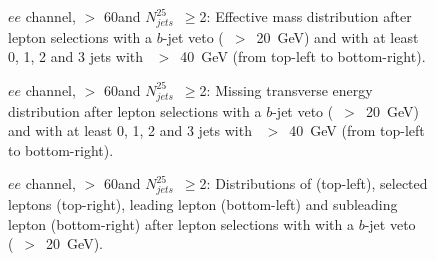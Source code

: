 \begin{figure}[h!]
\centering
{}
\caption{$ee$ channel, \met $>$ 60\GeV and $N_{jets}^{25}$~$\ge$2: Effective mass distribution after lepton selections with a $b$-jet veto (\pt~$>$~20~GeV) and with at least 0, 1, 2 and 3 jets with \pt~$>$~40~GeV (from top-left to bottom-right).}
\label{Fig:VP_ee_0b_Meff}
\end{figure}
\begin{figure}[h!]
\centering
{}
\caption{$ee$ channel, \met $>$ 60\GeV and $N_{jets}^{25}$~$\ge$2: Missing transverse energy distribution after lepton selections with a $b$-jet veto (\pt~$>$~20~GeV) and with at least 0, 1, 2 and 3 jets with \pt~$>$~40~GeV (from top-left to bottom-right).}
\label{Fig:VP_ee_0b_Met}
\end{figure}
\begin{figure}[h!]
\centering
{}
\caption{$ee$ channel, \met $>$ 60\GeV and $N_{jets}^{25}$~$\ge$2: Distributions of \mt (top-left), selected leptons \pt (top-right), leading lepton \pt (bottom-left) and subleading lepton \pt (bottom-right) after lepton selections with with a $b$-jet veto (\pt~$>$~20~GeV).}
\label{Fig:VP_ee_0b_Njets_and_other}
\end{figure} 

\FloatBarrier


